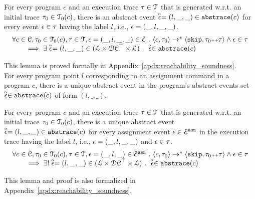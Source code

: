    \begin{lem}
     \label{lem:abscfg_sound}
     For every program $c$ and
     an execution trace $\mathtt{\tau} \in \mathcal{T}$ that is generated w.r.t.
     an initial trace  $\mathtt{\tau}_0 \in \mathcal{T}_0(c)$,
     there is an abstract event $\stackrel{\scriptscriptstyle{\alpha}}{\mathtt{\epsilon}{}} = (l, \_, \_) \in \mathtt{abs}{\mathtt{trace}}(c)$ 
     for every event $\mathtt{\epsilon} \in \mathtt{\tau}$ having the label $l$, i.e., $\mathtt{\epsilon} = (\_, l, \_, \_)$.
   \[
     \begin{array}{l}
       \forall c \in \mathcal{C}, \mathtt{\tau}_0 \in \mathcal{T}_0(c), \mathtt{\tau} \in \mathcal{T} ,  \mathtt{\epsilon} = (\_, l, \_, \_) \in \mathcal{E} ~.~
   \langle {c}, \mathtt{\tau}_0 \rangle \to^{*} \langle \mathtt{skip}, \mathtt{\tau}_0 {\scriptscriptstyle ++} \mathtt{\tau} \rangle 
   \land \mathtt{\epsilon} \in \mathtt{\tau} 
   \\
   \qquad \implies \exists \stackrel{\scriptscriptstyle{\alpha}}{\mathtt{\epsilon}{}} = (l, \_, \_) \in (\mathcal{L}\times \mathcal{DC}^{\top} \times \mathcal{L}) ~.~ 
   \stackrel{\scriptscriptstyle{\alpha}}{\mathtt{\epsilon}{}} \in \mathtt{abs}{\mathtt{trace}}(c)
   \end{array}
   \]
   \end{lem}
This lemma is proved formally in Appendix~\ref{apdx:reachability_soundness}.
\\
For every program point $l$ corresponding to an assignment command in a program $c$,
there is a unique abstract event in the program's abstract events set $\stackrel{\scriptscriptstyle{\alpha}}{\mathtt{\epsilon}{}} \in \mathtt{abs}{\mathtt{trace}}(c)$ of form $(l, \_, \_)$. 
\begin{lem}
  \label{lem:abscfg_uniquex}
  For every program $c$ and
  an execution trace $\mathtt{\tau} \in \mathcal{T}$ that is generated w.r.t.
  an initial trace  $\mathtt{\tau}_0 \in \mathcal{T}_0(c)$,
  there is a unique abstract event $\stackrel{\scriptscriptstyle{\alpha}}{\mathtt{\epsilon}{}} = (l, \_, \_) \in \mathtt{abs}{\mathtt{trace}}(c)$ 
  for every assignment event $\mathtt{\epsilon} \in \mathcal{E}^{\mathtt{{asn}}}$ in the
  execution trace having the label $l$, i.e., $\mathtt{\epsilon} = (\_, l, \_, \_)$ and  $\mathtt{\epsilon} \in \mathtt{\tau}$.
%
\[
  \begin{array}{l}
    \forall c \in \mathcal{C}, \mathtt{\tau}_0 \in \mathcal{T}_0(c), \mathtt{\tau} \in \mathcal{T} ,  \mathtt{\epsilon} = (\_, l, \_) \in \mathcal{E}^{\mathtt{{asn}}} ~.~
\langle {c}, \mathtt{\tau}_0 \rangle \to^{*} \langle \mathtt{skip}, \mathtt{\tau}_0 {\scriptscriptstyle ++} \mathtt{\tau} \rangle 
\land \mathtt{\epsilon} \in \mathtt{\tau} 
\\
\qquad \implies \exists! \stackrel{\scriptscriptstyle{\alpha}}{\mathtt{\epsilon}{}} = (l, \_, \_) \in (\mathcal{L}\times \mathcal{DC}^{\top} \times \mathcal{L}) ~.~ 
\stackrel{\scriptscriptstyle{\alpha}}{\mathtt{\epsilon}{}} \in \mathtt{abs}{\mathtt{trace}}(c)
\end{array}
\]
\end{lem}
This lemma and proof is also 
formalized in Appendix~\ref{apdx:reachability_soundness}.

